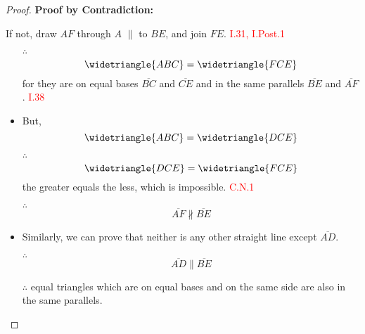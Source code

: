 \begin{proof}

\textbf{Proof by Contradiction:}

If not, draw $AF$ through $A$ $\parallel$ to $BE$, and join $FE$. \hfill\textcolor{red}{ I.31, I.Post.1}

\begin{figure}[H]
	\caption{}
\end{figure}

\begin{itemize}

\item[$\therefore$] 
\[\widetriangle{ABC} = \widetriangle{FCE}\]
for they are on equal bases $\overline{BC}$ and $\overline{CE}$ and in the same parallels $\overline{BE}$ and $\overline{AF}$. \hfill\textcolor{red}{I.38} 

\item But, 
\[\widetriangle{ABC} = \widetriangle{DCE}\] 

\item[$\therefore$] 
\[\widetriangle{DCE} = \widetriangle{FCE}\] 
the greater equals the less, which is impossible. \hfill\textcolor{red}{C.N.1}

\item[$\therefore$] 
\[\overline{AF} \nparallel \overline{BE}\]

\item Similarly, we can prove that neither is any other straight line except $\overline{AD}$.

\item[$\therefore$] 
\[\overline{AD} \parallel \overline{BE}\]

\item[$\therefore$] equal triangles which are on equal bases and on the same side are also in the same parallels.

\end{itemize}

\end{proof}

\clearpage
